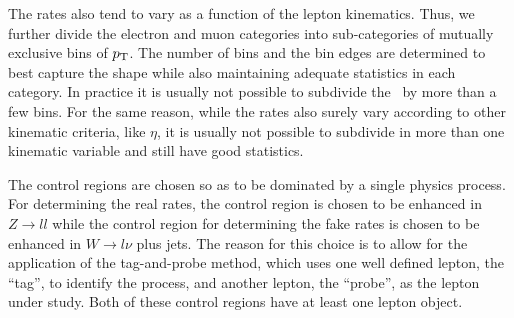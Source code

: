 The rates also tend to vary as a function of the lepton kinematics.
Thus, we further divide the electron
and muon categories into sub-categories of mutually exclusive bins of
$p_{\mathrm{T}}$. The number of bins and the bin edges are determined 
to best capture the shape while also maintaining adequate statistics
in each category. In practice it is usually not possible to subdivide
the \pt~by more than a few bins. For the same reason, while
the rates also surely vary according to other kinematic criteria, 
like $\eta$, it is usually not possible to subdivide in more than
one kinematic variable and still have good statistics.


The control regions are chosen so as to be dominated by a single 
physics process.  For determining the real rates, the 
control region is chosen to be enhanced in $Z\rightarrow ll$
while the control region for determining the fake rates is
chosen to be enhanced in 
$W\rightarrow l\nu$ plus jets.
The reason for this choice is to allow for the application of the
tag-and-probe method, which uses one well defined lepton, the
``tag'', to identify the process, and another lepton, the ``probe'',
as the lepton under study. Both of these control regions
have at least one lepton object. 


